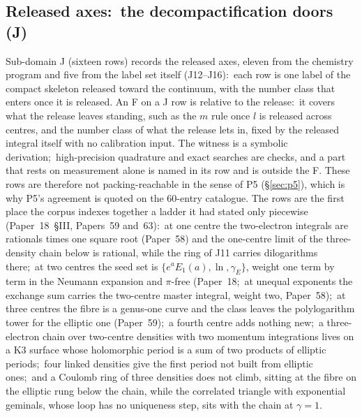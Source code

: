 \documentclass[11pt,a4paper]{article}
\theoremstyle{plain}
\theoremstyle{definition}
\begin{document}
\subsection{Released axes:\ the decompactification doors (J)}
\label{sec:forced_released}

Sub-domain J (sixteen rows) records the released axes, eleven from the chemistry program and five from the label set itself (J12--J16):\ each row is one label of the compact skeleton released toward the continuum, with the number class that enters once it is released. An F on a J row is relative to the release:\ it covers what the release leaves standing, such as the $m$ rule once $l$ is released across centres, and the number class of what the release lets in, fixed by the released integral itself with no calibration input. The witness is a symbolic derivation;\ high-precision quadrature and exact searches are checks, and a part that rests on measurement alone is named in its row and is outside the F. These rows are therefore not packing-reachable in the sense of P5 (\S\ref{sec:p5}), which is why P5's agreement is quoted on the 60-entry catalogue. The rows are the first place the corpus indexes together a ladder it had stated only piecewise (Paper~18~\S III, Papers~59 and~63):\ at one centre the two-electron integrals are rationals times one square root (Paper~58) and the one-centre limit of the three-density chain below is rational, while the ring of J11 carries dilogarithms there;\ at two centres the seed set is $\{e^{a}E_1(a), \ln, \gamma_E\}$, weight one term by term in the Neumann expansion and $\pi$-free (Paper~18;\ at unequal exponents the exchange sum carries the two-centre master integral, weight two, Paper~58);\ at three centres the fibre is a genus-one curve and the class leaves the polylogarithm tower for the elliptic one (Paper~59);\ a fourth centre adds nothing new;\ a three-electron chain over two-centre densities with two momentum integrations lives on a K3 surface whose holomorphic period is a sum of two products of elliptic periods;\ four linked densities give the first period not built from elliptic ones;\ and a Coulomb ring of three densities does not climb, sitting at the fibre on the elliptic rung below the chain, while the correlated triangle with exponential geminals, whose loop has no uniqueness step, sits with the chain at $\gamma=1$.
\end{document}
